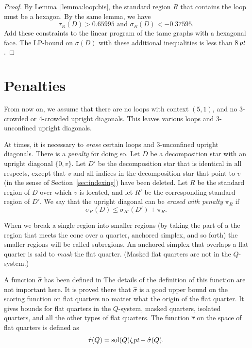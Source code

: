 \begin{proof} By Lemma~\ref{lemma:loop:bis}, the standard region $R$ that contains
the loop must be a hexagon.  By the same lemma, we have
    $$\tau_R(D) > 0.65995 \text{ and }\sigma_R(D) < -0.37595.$$
Add these constraints to the linear program of the tame graphs
with a hexagonal face. The LP-bound on $\sigma(D)$ with these
additional inequalities is less than $8\,\hbox{\it pt}$.
\end{proof}



\section{Penalties}\label{sec:penalty-lp}

From now on, we assume that there are no loops with context
$(5,1)$, and no $3$-crowded or $4$-crowded upright diagonals. This
leaves various loops and $3$-unconfined upright diagonals.

At times, it is necessary to {\it
erase} certain loops and $3$-unconfined upright diagonals.
There is a {\it penalty} for doing so.  Let $D$ be a decomposition
star with an upright diagonal $\{0,v\}$.
%
Let $D'$ be the decomposition star that is identical in all
respects, except that $v$ and all indices in the decomposition
star that point to $v$ (in the sense of
Section~\ref{sec:indexing}) have been deleted.  Let $R$ be the
standard region of $D$ over which $v$ is located, and let $R'$ be
the corresponding standard region of $D'$.  We say that the
upright diagonal can be {\it erased with penalty\/} $\pi_R$ if
    $$\sigma_R(D) \le \sigma_{R'}(D') + \pi_R.$$

\begin{definition}  When we break a single region into smaller
regions (by taking the part of a the region that meets the cone
over a quarter, anchored simplex, and so forth) the smaller
regions will be called subregions.  An anchored simplex that
overlaps a flat quarter is said to {\it mask\/} the flat quarter.
  (Masked flat quarters are not in
the $Q$-system.)
\end{definition}

\begin{remark}  A function $\hat\sigma$ has been defined in
  The details of the
definition of this function are not important here.  It is proved
there that $\hat\sigma$ is a good upper bound on the scoring
function on flat quarters no matter what the origin of the flat
quarter.  It gives bounds for flat quarters in the $Q$-system,
masked quarters, isolated quarters, and all the other types of
flat quarters.  The function $\hat\tau$ on the space of flat
quarters is defined as
    $$\hat\tau(Q) = \operatorname{sol}(Q)\zeta\hbox{\it pt} - \hat\sigma(Q).$$
\end{remark}


